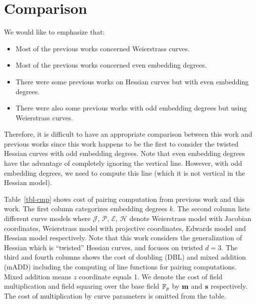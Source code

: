 \section{Comparison}
\label{sec:cmp}

We would like to emphasize that:
\begin{itemize}
\item	Most of the previous works concerned Weierstrass curves.
\item	Most of the previous works concerned even embedding degrees.
\item	There were some previous works on Hessian curves but with even embedding degrees.
\item	There were also some previous works with odd embedding degrees but using Weierstrass curves.
\end{itemize}
Therefore, it is difficult to have an appropriate comparison between this work and previous works
since this work happens to be the first to consider the twisted Hessian curves with odd embedding degrees.
Note that even embedding degrees have the advantage of completely ignoring the vertical line.
However, with odd embedding degrees, we need to compute this line (which it is not vertical in the Hessian model).

Table~\ref{tbl-cmp} shows cost of pairing computation from previous work and this work.
The first column categorizes embedding degrees $k$.
The second column lists different curve models where 
$\mathcal{J}$, $\mathcal{P}$, $\mathcal{E}$, $\mathcal{H}$ denote
Weierstrass model with Jacobian coordinates,
Weierstrass model with projective coordinates,
Edwards model and
Hessian model respectively.
Note that this work considers the generalization of Hessian which is ``twisted'' Hessian curves,
and focuses on twisted $d = 3$.
The third and fourth columns shows the cost of doubling (DBL) and mixed addition (mADD) including the computing of line functions for pairing computations.
Mixed addition means $z$ coordinate equals 1.
We denote the cost of field multiplication and field squaring over the base field $\mathbb{F}_{p}$ by $\textbf{m}$ and $\textbf{s}$ respectively.
The cost of multiplication by curve parameters is omitted from the table.

